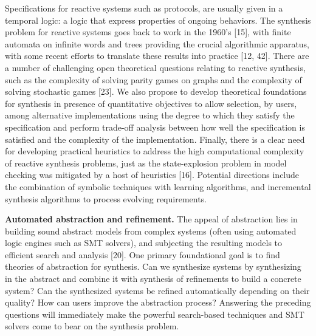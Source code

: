 Specifications for reactive systems such as protocols, are usually given in a temporal logic: a logic that express properties of ongoing behaviors. The synthesis problem for reactive systems goes back to work in the 1960’s [15], with finite automata on infinite words and trees providing the crucial algorithmic apparatus, with some recent efforts to translate these results into practice [12, 42]. There are a number of challenging open theoretical questions relating to reactive synthesis, such as the complexity of solving parity games on graphs and the complexity of solving stochastic games [23]. We also propose to develop theoretical foundations for synthesis in presence of quantitative objectives to allow selection, by users, among alternative implementations using the degree to which they satisfy the specification and perform trade-off analysis between how well the specification is satisfied and the complexity of the implementation. Finally, there is a clear need for developing practical heuristics to address the high computational complexity of reactive synthesis problems, just as the state-explosion problem in model checking was mitigated by a host of heuristics [16]. Potential directions include the combination of symbolic techniques with learning algorithms, and incremental synthesis algorithms to process evolving requirements.


\textbf{Automated abstraction and refinement.} The appeal of abstraction lies in building sound abstract models from complex systems (often using automated logic engines such as SMT solvers), and subjecting the resulting models to efficient search and analysis [20]. One primary foundational goal is to find theories of abstraction for synthesis. Can we synthesize systems by synthesizing in the abstract and combine it with synthesis of refinements to build a concrete system? Can the synthesized systems be refined automatically depending on their quality? How can users improve the abstraction process? Answering the preceding questions will immediately make the powerful search-based techniques and SMT solvers come to bear on the synthesis problem.

